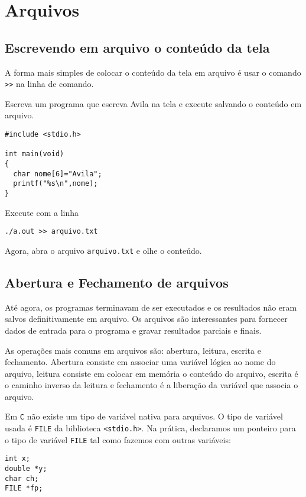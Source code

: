 
\chapter{Arquivos}
\section{Escrevendo em arquivo o conteúdo da tela}
A forma mais simples de colocar o conteúdo da tela em arquivo é usar o comando \verb|>>| na linha de comando.
\begin{ex}
Escreva um programa que escreva Avila na tela e execute salvando o conteúdo em arquivo.
\end{ex}
\begin{verbatim}
#include <stdio.h>

int main(void)
{
  char nome[6]="Avila";
  printf("%s\n",nome);
}
\end{verbatim}
Execute com a linha
\begin{verbatim}
./a.out >> arquivo.txt
\end{verbatim}
Agora, abra o arquivo \verb|arquivo.txt| e olhe o conteúdo.

\section{Abertura e Fechamento de arquivos}
Até agora, os programas terminavam de ser executados e os resultados não eram salvos definitivamente em arquivo. Os arquivos são interessantes para fornecer dados de entrada para o programa e gravar resultados parciais e finais.

As operações mais comuns em arquivos são: abertura, leitura, escrita e fechamento. Abertura consiste em associar uma variável lógica ao nome do arquivo, leitura consiste em colocar em memória o conteúdo do arquivo, escrita é o caminho inverso da leitura e fechamento é a liberação da variável que associa o arquivo.

Em \verb|C| não existe um tipo de variável nativa para arquivos. O tipo de variável usada é \verb|FILE| da biblioteca \verb|<stdio.h>|. Na prática, declaramos um ponteiro para o tipo de variável \verb|FILE| tal como fazemos com outras variáveis:
\begin{verbatim}
int x;
double *y;
char ch;
FILE *fp;
\end{verbatim}

